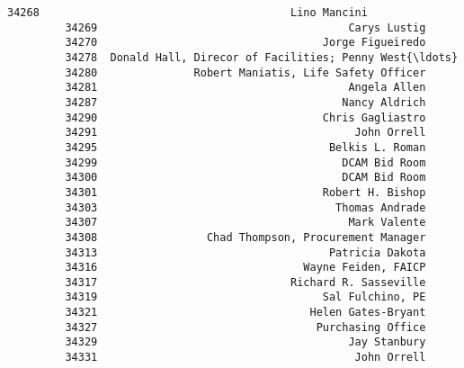 \documentclass[11pt]{article}
\begin{document}
\begin{Verbatim}[commandchars=\\\{\}]
         34268                                       Lino Mancini   
         34269                                       Carys Lustig   
         34270                                   Jorge Figueiredo   
         34278  Donald Hall, Direcor of Facilities; Penny West{\ldots}   
         34280               Robert Maniatis, Life Safety Officer   
         34281                                       Angela Allen   
         34287                                      Nancy Aldrich   
         34290                                   Chris Gagliastro   
         34291                                        John Orrell   
         34295                                    Belkis L. Roman   
         34299                                      DCAM Bid Room   
         34300                                      DCAM Bid Room   
         34301                                   Robert H. Bishop   
         34303                                     Thomas Andrade   
         34307                                       Mark Valente   
         34308                 Chad Thompson, Procurement Manager   
         34313                                    Patricia Dakota   
         34316                                Wayne Feiden, FAICP   
         34317                              Richard R. Sasseville   
         34319                                   Sal Fulchino, PE   
         34321                                 Helen Gates-Bryant   
         34327                                  Purchasing Office   
         34329                                       Jay Stanbury   
         34331                                        John Orrell   
         

\end{Verbatim}
\end{document}
